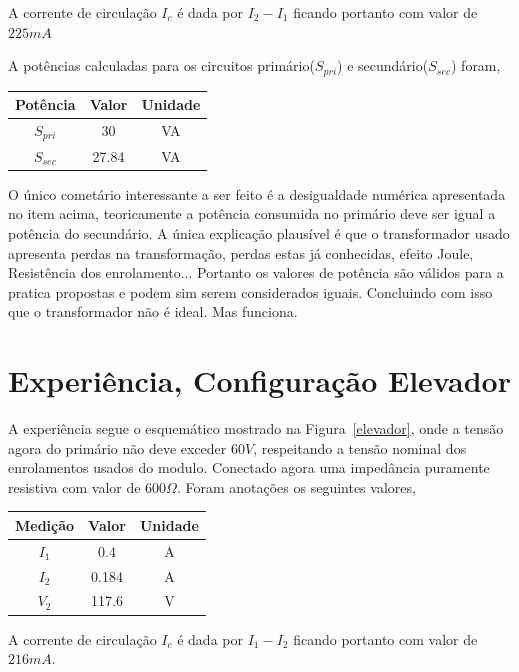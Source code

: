 \documentclass[paper=a4, fontsize=11pt]{article}
\begin{document}
A corrente de circulação $I_c$ é dada por $I_2 - I_1$ ficando portanto com 
valor de $225 mA$

A potências calculadas para os circuitos primário($S_{pri}$) e secundário($S_{sec}$) foram, 


\begin{center}
    \begin{tabular}{c||c||c}
        Potência & Valor & Unidade \\
        \hline
        $S_{pri}$ & 30 & VA \\
        $S_{sec}$ & 27.84 & VA \\
    \end{tabular}
\end{center}

O único cometário interessante a ser feito é a desigualdade numérica apresentada no 
item acima, teoricamente a potência consumida no primário deve ser igual a potência
do secundário. A única explicação plausível é que o transformador usado apresenta
perdas na transformação, perdas estas já conhecidas, efeito Joule, Resistência dos
enrolamento... Portanto os valores de potência são válidos para a pratica propostas
e podem sim serem considerados iguais. Concluindo com isso que o transformador
não é ideal. Mas funciona.

\section{Experiência, Configuração Elevador}

A experiência segue o esquemático mostrado na Figura~\ref{elevador}, onde a tensão
agora do primário não deve exceder $60 V$, respeitando a tensão nominal dos 
enrolamentos usados do modulo. Conectado agora uma impedância puramente
resistiva com valor de $600 \Omega$. Foram anotações os seguintes valores,

\begin{center}
    \begin{tabular}{c||c||c}
        Medição & Valor & Unidade \\
        \hline
        $I_1$ & 0.4 & A \\
        $I_2$ & 0.184 & A \\
        $V_2$ & 117.6 & V \\
    \end{tabular}
\end{center}

A corrente de circulação $I_c$ é dada por $I_1 - I_2$ ficando portanto com 
valor de $216 mA$.
\end{document}
